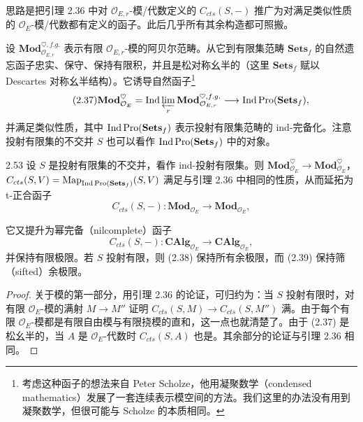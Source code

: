 思路是把引理 2.36 中对 $\mathcal O_{E,r}$-模/代数定义的 $C_{cts}(S,-)$ 推广为对满足类似性质的 $\mathcal O_E$-模/代数都有定义的函子。此后几乎所有其余构造都可照搬。

设 $\mathbf{Mod}^{\heartsuit,f.g.}_{\mathcal O_{E,r}}$ 表示有限 $\mathcal O_{E,r}$-模的阿贝尔范畴。从它到有限集范畴 $\mathbf{Sets}_f$ 的自然遗忘函子忠实、保守、保持有限积，并且是松对称幺半的（这里 $\mathbf{Sets}_f$ 赋以 Descartes 对称幺半结构）。它诱导自然函子\footnote{考虑这种函子的想法来自 Peter Scholze，他用凝聚数学（condensed mathematics）发展了一套连续表示模空间的方法。我们这里的办法没有用到凝聚数学，但很可能与 Scholze 的本质相同。}
\begin{equation*}\tag{2.37}
\mathbf{Mod}^{\heartsuit}_{\mathcal O_E}=\operatorname{Ind}\varprojlim_r\mathbf{Mod}^{\heartsuit,f.g.}_{\mathcal O_{E,r}}\longrightarrow \operatorname{Ind}\mathrm{Pro}(\mathbf{Sets}_f),
\end{equation*}
并满足类似性质，其中 $\operatorname{Ind}\mathrm{Pro}(\mathbf{Sets}_f)$ 表示投射有限集范畴的 ind-完备化。注意投射有限集的不交并 $S$ 也可以看作 $\operatorname{Ind}\mathrm{Pro}(\mathbf{Sets}_f)$ 中的对象。

\begin{lem}{2.53}
设 $S$ 是投射有限集的不交并，看作 ind-投射有限集。则
$\mathbf{Mod}^{\heartsuit}_{\mathcal O_E}\to\mathbf{Mod}^{\heartsuit}_{\mathcal O_E}$，$C_{cts}(S,V)=\operatorname{Map}_{\operatorname{Ind}\mathrm{Pro}(\mathbf{Sets}_f)}(S,V)$
满足与引理 2.36 中相同的性质，从而延拓为 t-正合函子
\begin{equation*}\tag{2.38}
C_{cts}(S,-):\mathbf{Mod}_{\mathcal O_E}\longrightarrow\mathbf{Mod}_{\mathcal O_E},
\end{equation*}

它又提升为幂完备（nilcomplete）函子
\begin{equation*}\tag{2.39}
C_{cts}(S,-):\mathbf{CAlg}_{\mathcal O_E}\longrightarrow\mathbf{CAlg}_{\mathcal O_E},
\end{equation*}
并保持有限极限。若 $S$ 投射有限，则 (2.38) 保持所有余极限，而 (2.39) 保持筛（sifted）余极限。
\end{lem}

\begin{proof}
关于模的第一部分，用引理 2.36 的论证，可归约为：当 $S$ 投射有限时，对有限 $\mathcal O_E$-模的满射 $M\to M''$ 证明 $C_{cts}(S,M)\to C_{cts}(S,M'')$ 满。由于每个有限 $\mathcal O_E$-模都是有限自由模与有限挠模的直和，这一点也就清楚了。由于 (2.37) 是松幺半的，当 $A$ 是 $\mathcal O_E$-代数时 $C_{cts}(S,A)$ 也是。其余部分的论证与引理 2.36 相同。
\end{proof}

